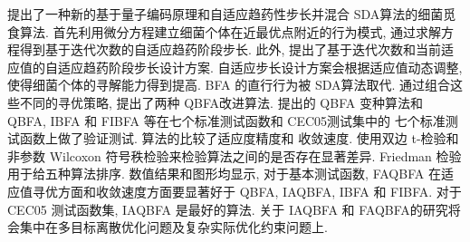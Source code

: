提出了一种新的基于量子编码原理和自适应趋药性步长并混合 SDA算法的细菌觅食算法. 首先利用微分方程建立细菌个体在近最优点附近的行为模式, 通过求解方程得到基于迭代次数的自适应趋药阶段步长. 此外, 提出了基于迭代次数和当前适应值的自适应趋药阶段步长设计方案. 自适应步长设计方案会根据适应值动态调整, 使得细菌个体的寻解能力得到提高. BFA 的直行行为被 SDA算法取代. 通过组合这些不同的寻优策略, 提出了两种 QBFA改进算法. 提出的 QBFA 变种算法和 QBFA, IBFA 和 FIBFA 等在七个标准测试函数和 CEC05测试集中的 七个标准测试函数上做了验证测试. 算法的比较了适应度精度和 收敛速度. 使用双边 t-检验和非参数 Wilcoxon 符号秩检验来检验算法之间的是否存在显著差异. Friedman 检验用于给五种算法排序. 数值结果和图形均显示, 对于基本测试函数, FAQBFA 在适应值寻优方面和收敛速度方面要显著好于 QBFA, IAQBFA, IBFA 和 FIBFA. 对于 CEC05 测试函数集, IAQBFA 是最好的算法. 关于 IAQBFA 和 FAQBFA的研究将会集中在多目标离散优化问题及复杂实际优化约束问题上.
